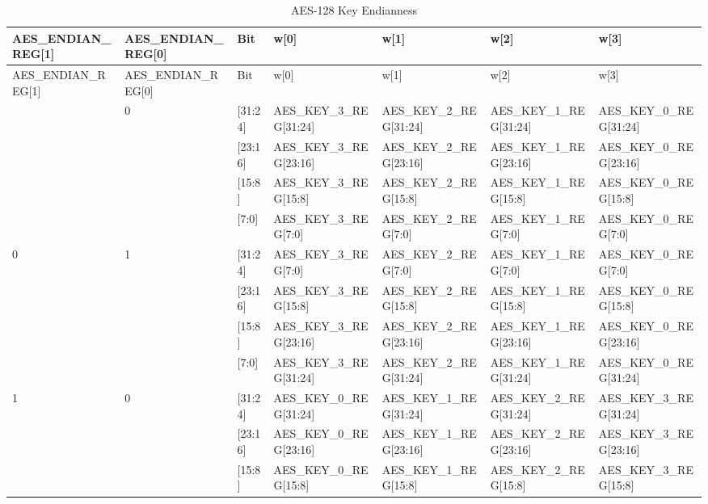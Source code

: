 \documentclass[main\_\_EN.tex]{subfiles}
\begin{document}
\begin{landscape}

\begin{tiny}
\begin{longtable}[c]
{ |p{2cm}|p{2cm}|p{1cm}|p{2.5cm}|p{2.5cm}|p{2.5cm}|p{2.5cm}|}
\caption{AES-128 Key Endianness}\label{table:AES128KeyEndian}\\
\hline
\rowcolor{lightgray}
AES\_ENDIAN\_REG[1]	&	AES\_ENDIAN\_REG[0]	&	Bit	&	w[0]	&	w[1]	&	w[2] 	&	w[3]	\\\hline
\endfirsthead
\hline
\rowcolor{lightgray}
AES\_ENDIAN\_REG[1]	&	AES\_ENDIAN\_REG[0]	&	Bit	&	w[0]	&	w[1]	&	w[2] 	&	w[3]	\\\hline
\endhead
\endfoot
\multirow{4}{4cm}{0} 	&	\multirow{4}{4cm}{0}	&	[31:24] 	&	AES\_KEY\_3\_REG[31:24]	&	AES\_KEY\_2\_REG[31:24]	& AES\_KEY\_1\_REG[31:24]	&	AES\_KEY\_0\_REG[31:24]\\
\cline{3-7}
&&	[23:16] 	&	AES\_KEY\_3\_REG[23:16]	&	AES\_KEY\_2\_REG[23:16] 	&	AES\_KEY\_1\_REG[23:16]	&	AES\_KEY\_0\_REG[23:16]\\
\cline{3-7}
&&	[15:8]	&	AES\_KEY\_3\_REG[15:8]	&	AES\_KEY\_2\_REG[15:8] 	&	AES\_KEY\_1\_REG[15:8]	&	AES\_KEY\_0\_REG[15:8]\\
\cline{3-7}
&&	[7:0]	&	AES\_KEY\_3\_REG[7:0]	&	AES\_KEY\_2\_REG[7:0] 	&	AES\_KEY\_1\_REG[7:0]	&	AES\_KEY\_0\_REG[7:0]\\
\hline
\multirow{4}{4cm}{0} 	&	\multirow{4}{4cm}{1}	&	[31:24] 	&	AES\_KEY\_3\_REG[7:0]	&	AES\_KEY\_2\_REG[7:0] 	&	AES\_KEY\_1\_REG[7:0]	&	AES\_KEY\_0\_REG[7:0]\\
\cline{3-7}
&&	[23:16] 	&	AES\_KEY\_3\_REG[15:8]	&	AES\_KEY\_2\_REG[15:8] 	&	AES\_KEY\_1\_REG[15:8]	&	AES\_KEY\_0\_REG[15:8]\\
\cline{3-7}
&&	[15:8] 	&	AES\_KEY\_3\_REG[23:16]	&	AES\_KEY\_2\_REG[23:16] 	&	AES\_KEY\_1\_REG[23:16]	&	AES\_KEY\_0\_REG[23:16]\\
\cline{3-7}
&&	[7:0]	&	AES\_KEY\_3\_REG[31:24]	&	AES\_KEY\_2\_REG[31:24]	& AES\_KEY\_1\_REG[31:24]	&	AES\_KEY\_0\_REG[31:24]\\
\hline
\multirow{4}{4cm}{1} 	&	\multirow{4}{4cm}{0}	&	[31:24] 	&	AES\_KEY\_0\_REG[31:24]	&	AES\_KEY\_1\_REG[31:24]	& AES\_KEY\_2\_REG[31:24]	&	AES\_KEY\_3\_REG[31:24]\\
\cline{3-7}
&&	[23:16] 	&	AES\_KEY\_0\_REG[23:16]	&	AES\_KEY\_1\_REG[23:16] 	&	AES\_KEY\_2\_REG[23:16]	&	AES\_KEY\_3\_REG[23:16]\\
\cline{3-7}
&&	[15:8]	&	AES\_KEY\_0\_REG[15:8]	&	AES\_KEY\_1\_REG[15:8] 	&	AES\_KEY\_2\_REG[15:8]	&	AES\_KEY\_3\_REG[15:8]\\

\end{longtable}
\end{tiny}
\end{landscape}
\end{document}
